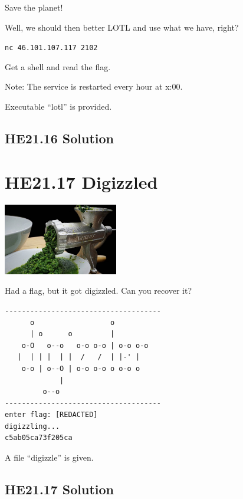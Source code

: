 \documentclass[english,a4paper,nols,noindent]{tufte-handout}
\begin{document}
\noindent Save the planet!

Well, we should then better LOTL and use what we have, right?

\verb+nc 46.101.107.117 2102+

Get a shell and read the flag.

Note: The service is restarted every hour at x:00.

Executable ``lotl'' is provided.

\hypertarget{he21.16-solution}{%
\subsection{HE21.16 Solution}\label{he21.16-solution}}

\noindent 

\hypertarget{he21.17}{%
  \section{HE21.17 Digizzled}
  \label{he21.17}}
\begin{marginfigure}
    \includegraphics[width=50mm]{images/challenge17.jpg}
\end{marginfigure}

\noindent Had a flag, but it got digizzled. Can you recover it?

\begin{verbatim}
-------------------------------------  
      o                  o             
      | o      o         |             
    o-O   o--o   o-o o-o | o-o o-o     
   |  | | |  | |  /   /  | |-' |       
    o-o | o--O | o-o o-o o o-o o       
             |                         
         o--o                          
-------------------------------------
enter flag: [REDACTED]    
digizzling...  
c5ab05ca73f205ca  
\end{verbatim}

A file ``digizzle'' is given.

\hypertarget{he21.17-solution}{%
\subsection{HE21.17 Solution}\label{he21.17-solution}}
\end{document}
